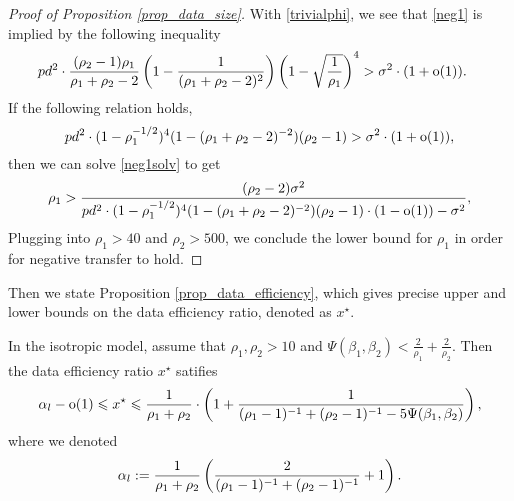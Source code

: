 \begin{proof}[Proof of Proposition \ref{prop_data_size}]
 
With \eqref{trivialphi}, we see that \eqref{neg1} is implied by the following inequality
\begin{align}\label{neg1solv}
 & pd^2 \cdot \frac{(\rho_2-1) \rho_1 }{\rho_1+\rho_2-2}\left( 1-\frac{1}{(\rho_1+\rho_2-2)^2}\right) \left({1 - \sqrt{\frac{1}{\rho_1}}}\right)^4 >\sigma^2\cdot (1+\operatorname{o}(1)) .
 \end{align}
If the following relation holds,
$$pd^2 \cdot (1-\rho_1^{-1/2})^4(1-(\rho_1+\rho_2-2)^{-2})(\rho_2 - 1) >  \sigma^2\cdot (1+\operatorname{o}(1))  , $$
 then we can solve \eqref{neg1solv} to get
 $$\rho_1 > \frac{(\rho_2-2) \sigma^2}{pd^2 \cdot (1-\rho_1^{-1/2})^4(1-(\rho_1+\rho_2-2)^{-2})(\rho_2 - 1)\cdot (1-\operatorname{o}(1))  - \sigma^2}  ,$$
 Plugging into $\rho_1>40$ and $\rho_2>500$, we conclude the lower bound for $\rho_1$ in order for negative transfer to hold.
 \end{proof}
 
 
Then we state Proposition \ref{prop_data_efficiency}, which gives precise upper and lower bounds on the data efficiency ratio, denoted as $x^\star$.

\begin{proposition}\label{prop_data_efficiency}
	In the isotropic model, assume that $\rho_1,\rho_2 > 10$ and $\Psi(\beta_1, \beta_2) < \frac{2}{\rho_1} + \frac{2}{\rho_2}$.
	Then the data efficiency ratio $x^\star$ satifies 
	\[ \alpha_l - \operatorname{o}(1) \leqslant x^\star\leqslant \frac{1}{\rho_1 + \rho_2}\cdot \left({1 + \frac{1}{(\rho_1-1)^{-1} + (\rho_2-1)^{-1} - 5\Psi(\beta_1, \beta_2)}}\right), \]
	where we denoted
	$$\alpha_l:= \frac1{\rho_1+\rho_2}\left(\frac{2}{(\rho_1-1)^{-1}+(\rho_2 -1)^{-1}}+1\right).$$
\end{proposition}


